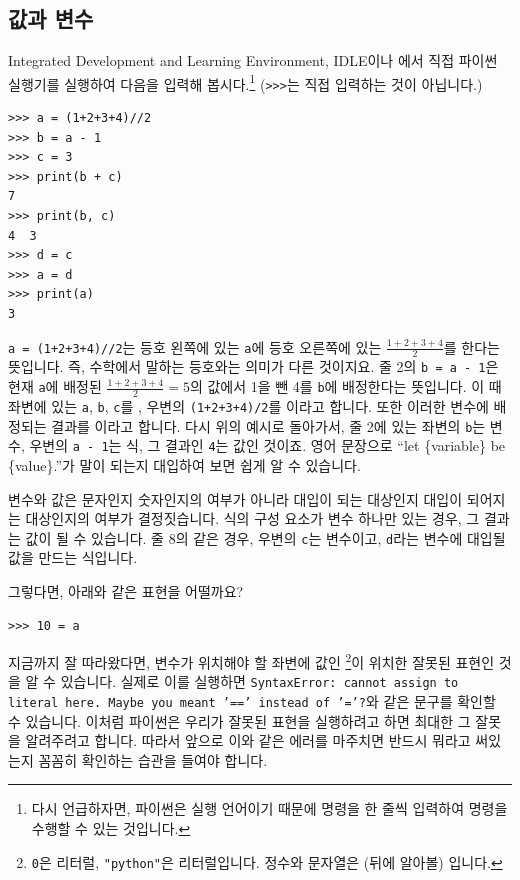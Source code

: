 \documentclass[../main.tex]{subfiles}
\begin{document}
\subsection{값과 변수}
Integrated Development and Learning Environment, IDLE이나 에서 직접 파이썬 실행기를 실행하여 다음을 입력해 봅시다.\footnote{다시 언급하자면, 파이썬은 실행 언어이기 때문에 명령을 한 줄씩 입력하여 명령을 수행할 수 있는 것입니다.}
(\verb/>>>/는 직접 입력하는 것이 아닙니다.)
\begin{verbatim}
>>> a = (1+2+3+4)//2
>>> b = a - 1
>>> c = 3
>>> print(b + c)
7
>>> print(b, c)
4  3
>>> d = c
>>> a = d
>>> print(a)
3
\end{verbatim}
\verb!a = (1+2+3+4)//2!는 등호 왼쪽에 있는 \verb/a/에 등호 오른쪽에 있는 $\frac{1+2+3+4}{2}$를 한다는 뜻입니다.
즉, 수학에서 말하는 등호와는 의미가 다른 것이지요.
줄 2의 \verb/b = a - 1/은 현재 \verb/a/에 배정된 $\frac{1+2+3+4}{2} = 5$의 값에서 1을 뺀 4를 \verb/b/에 배정한다는 뜻입니다.
이 때 좌변에 있는 \verb/a/, \verb/b/, \verb/c/를 , 우변의 \verb!(1+2+3+4)/2!를 이라고 합니다.
또한 이러한 변수에 배정되는 결과를 이라고 합니다.
다시 위의 예시로 돌아가서, 줄 2에 있는 좌변의 \verb/b/는 변수, 우변의 \verb/a - 1/는 식, 그 결과인 \verb/4/는 값인 것이죠.
영어 문장으로 ``let \{variable\} be \{value\}.''가 말이 되는지 대입하여 보면 쉽게 알 수 있습니다.

변수와 값은 문자인지 숫자인지의 여부가 아니라 대입이 되는 대상인지 대입이 되어지는 대상인지의 여부가 결정짓습니다.
식의 구성 요소가 변수 하나만 있는 경우, 그 결과는 값이 될 수 있습니다.
줄 8의 같은 경우, 우변의 \verb/c/는 변수이고, \verb/d/라는 변수에 대입될 값을 만드는 식입니다.

그렇다면, 아래와 같은 표현을 어떨까요?
\begin{verbatim}
>>> 10 = a
\end{verbatim}
지금까지 잘 따라왔다면, 변수가 위치해야 할 좌변에 값인 \footnote{\texttt{0}은  리터럴, \texttt{"python"}은  리터럴입니다. 정수와 문자열은 (뒤에 알아볼) 입니다.}이 위치한 잘못된 표현인 것을 알 수 있습니다.
실제로 이를 실행하면 \texttt{SyntaxError: cannot assign to literal here. Maybe you meant '==' instead of '='?}와 같은 문구를 확인할 수 있습니다.
이처럼 파이썬은 우리가 잘못된 표현을 실행하려고 하면 최대한 그 잘못을 알려주려고 합니다.
따라서 앞으로 이와 같은 에러를 마주치면 반드시 뭐라고 써있는지 꼼꼼히 확인하는 습관을 들여야 합니다.
\end{document}
